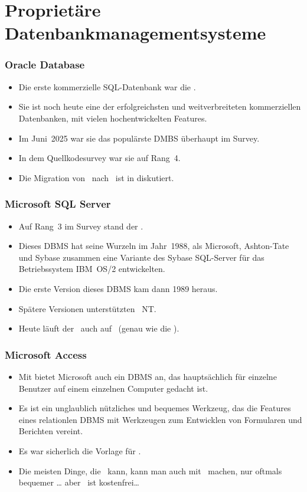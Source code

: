 \documentclass[aspectratio=169,mathserif,notheorems]{beamer}%
\begin{document}
\section{Proprietäre Datenbankmanagementsysteme}%
%
\begin{frame}%
\frametitle{Oracle Database}%
\begin{itemize}%
\item Die erste kommerzielle SQL-Datenbank war die \oracleDB\cite{C20245YOQ,O2007OTHTMIMIOHWCFTPWMIH}.%
\item<2-> Sie ist noch heute eine der erfolgreichsten und weitverbreiteten kommerziellen Datenbanken, mit vielen hochentwickelten Features\cite{BBDDSY2011ADOODM,KK2021EODATASFHPAP}.%
\item<3-> Im Juni~2025 war sie das populärste DMBS überhaupt im Survey\cite{RS2025DERORD}.
\item<4-> In dem  Quellkodesurvey\cite{PMPVEPWGSMB2025ATAODMSTTHOOSP} war sie auf Rang~4.%
\item<5-> Die Migration von \oracleDB\ nach \postgresql\ ist in\cite{KO2023DMFOTP} diskutiert.%
\end{itemize}%
\end{frame}%
%
\begin{frame}%
\frametitle{Microsoft SQL Server}%
\begin{itemize}%
\item Auf Rang~3 im Survey\cite{RS2025DERORD} stand der \microsoftSqlServer\cite{P2020MSS2ABG,A2024TSAFMSS2,W2018MSSDB}.%
\item<2-> Dieses DBMS hat seine Wurzeln im Jahr~1988, als Microsoft, Ashton-Tate und Sybase zusammen eine Variante des Sybase SQL-Server für das Betriebssystem IBM~OS/2 entwickelten\cite{W2018MSSDB:TEOMSS}.%
\item<3-> Die erste Version dieses DBMS kam dann 1989 heraus.%
\item<4-> Spätere Versionen unterstützten \microsoftWindows~NT.%
\item<5-> Heute läuft der \microsoftSqlServer\ auch auf \linux~(genau wie die \oracleDB).%
\end{itemize}%
\end{frame}%
%
\begin{frame}%
\frametitle{Microsoft Access}%
\begin{itemize}%
\item Mit \microsoftAccess\cite{LF2022MOSBSO2AM3} bietet Microsoft auch ein DBMS an, das hauptsächlich für einzelne Benutzer auf einem einzelnen Computer gedacht ist.%
\item<2-> Es ist ein unglaublich nützliches und bequemes Werkzeug, das die Features eines relationlen DBMS mit Werkzeugen zum Entwicklen von Formularen und Berichten vereint\cite{SSI2023MA2BTA,B2020HOMA2,UC2021AFD,MM2014RDAMA}.%
\item<3-> Es war sicherlich die Vorlage für \libreofficeBase.%
\item<4-> Die meisten Dinge, die \libreofficeBase\ kann, kann man auch mit \microsoftAccess\ machen, nur oftmals bequemer {\dots} aber \libreofficeBase\ ist kostenfrei\dots%
\end{itemize}%
\end{frame}%
\end{document}
